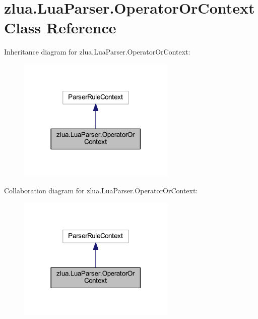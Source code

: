 \hypertarget{classzlua_1_1_lua_parser_1_1_operator_or_context}{}\section{zlua.\+Lua\+Parser.\+Operator\+Or\+Context Class Reference}
\label{classzlua_1_1_lua_parser_1_1_operator_or_context}


Inheritance diagram for zlua.\+Lua\+Parser.\+Operator\+Or\+Context\+:
\nopagebreak
\begin{figure}[H]
\begin{center}
\leavevmode
\includegraphics[width=213pt]{classzlua_1_1_lua_parser_1_1_operator_or_context__inherit__graph}
\end{center}
\end{figure}


Collaboration diagram for zlua.\+Lua\+Parser.\+Operator\+Or\+Context\+:
\nopagebreak
\begin{figure}[H]
\begin{center}
\leavevmode
\includegraphics[width=213pt]{classzlua_1_1_lua_parser_1_1_operator_or_context__coll__graph}
\end{center}
\end{figure}
